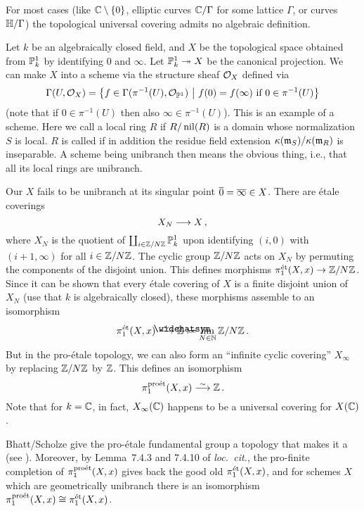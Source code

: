 \begin{exm}
	For most cases (like $\mathbb{C}\setminus\{0\}$, elliptic curves $\mathbb{C}/\Gamma$ for some lattice $\Gamma$, or curves $\mathbb{H}/\Gamma$) the topological universal covering admits no algebraic definition.
	
	Let $k$ be an algebraically closed field, and $X$ be the topological space obtained from $\mathbb{P}_k^1$ by identifying $0$ and $\infty$. Let $\IP_k^1\epimorphism X$ be the canonical projection. We can make $X$ into a scheme via the structure sheaf $\mathcal{O}_X$ defined via
	\begin{equation*}
		\operatorname{\Gamma}(U,\mathcal{O}_X)=\left\{f\in\operatorname{\Gamma}(\pi^{-1}(U),\mathcal{O}_{\mathbb{P}^1})\ \middle|\  f(0)=f(\infty)\text{ if }0\in\pi^{-1}(U)\right\}
	\end{equation*}
	(note that if $0\in\pi^{-1}(U)$ then also $\infty\in\pi^{-1}(U)$). This is an example of a  scheme. Here we call a local ring $R$  if $R/\operatorname{nil}(R)$ is a domain whose normalization $S$ is local. $R$ is called  if in addition the residue field extension $\kappa(\mathfrak{m}_S)/\kappa(\mathfrak{m}_R)$ is inseparable. A scheme being unibranch then means the obvious thing, i.e., that all its local rings are unibranch.
	
	Our $X$ fails to be unibranch at its singular point $\ov{0}=\ov{\infty}\in X$. There are étale coverings
	\begin{equation*}
		X_N\morphism X\,,
	\end{equation*}
	where $X_N$ is the quotient of $\coprod_{i\in\mathbb{Z}/N\mathbb{Z}}\mathbb{P}_k^1$ upon identifying $(i,0)$ with $(i+1,\infty)$ for all $i\in\mathbb{Z}/N\mathbb{Z}$. The cyclic group $\mathbb{Z}/N\mathbb{Z}$ acts on $X_N$ by permuting the components of the disjoint union. This defines morphisms $\pi_1^\et(X,x)\morphism\IZ/N\IZ$. Since it can be shown that every étale covering of $X$ is a finite disjoint union of $X_N$ (use that $k$ is algebraically closed), these morphisms assemble to an isomorphism
	\begin{equation*}
		\pi_1^\et(X,x)\isomorphism\roof{\IZ}\coloneqq\limit_{N\in\IN}\IZ/N\IZ\,.
	\end{equation*}
	But in the pro-étale topology, we can also form an \enquote{infinite cyclic covering} $X_\infty$ by replacing $\mathbb{Z}/N\mathbb{Z}$ by $\mathbb{Z}$. This defines an isomorphism
	\begin{equation*}
		\pi_1^\proet(X,x)\isomorphism \IZ\,.
	\end{equation*}
	Note that for $k=\mathbb{C}$, in fact, $X_\infty(\mathbb{C})$ happens to be a universal covering for $X(\mathbb{C})$.
	
	Bhatt/Scholze give the pro-étale fundamental group a topology that makes it a  (see \cite[Definition~7.1.1]{proetale}). Moreover, by Lemma~7.4.3 and 7.4.10 of \emph{loc.\ cit.}, the pro-finite completion of $\pi_1^{\mathrm{pro\acute{e}t}}(X,x)$ gives back the good old $\pi_1^{\mathrm{\acute{e}t}}(X,x)$, and for schemes $X$ which are geometrically unibranch there is an isomorphism $\pi_1^{\mathrm{pro\acute{e}t}}(X,x)\cong \pi_1^{\mathrm{\acute{e}t}}(X,x)$.
\end{exm}
